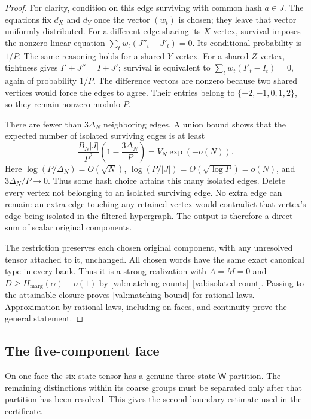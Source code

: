 \documentclass[11pt]{article}
\numberwithin{equation}{section}
\theoremstyle{definition}
\theoremstyle{remark}
\begin{document}
\begin{proof}
For clarity, condition on this edge surviving with common hash $a\in J$.
The equations fix $d_X$ and $d_Y$ once the vector $(w_t)$ is chosen; they
leave that vector uniformly distributed.  For a different edge sharing its
$X$ vertex, survival imposes the nonzero linear equation
$\sum_t w_t(J''_t-J'_t)=0$.  Its conditional probability is $1/P$.
The same reasoning holds for a shared $Y$ vertex.  For a shared $Z$ vertex,
tightness gives $I'+J''=I+J'$; survival is equivalent to
$\sum_t w_t(I'_t-I_t)=0$, again of probability $1/P$.
The difference vectors are nonzero because two shared vertices would force
the edges to agree.  Their entries belong to $\{-2,-1,0,1,2\}$, so they
remain nonzero modulo $P$.

There are fewer than $3\Delta_N$ neighboring edges.  A union bound shows
that the expected number of isolated surviving edges is at least
\begin{equation}
 \frac{B_N|J|}{P^2}
       \left(1-\frac{3\Delta_N}{P}\right)
       =V_N\exp(-o(N)).
\label{val:isolated-count}
\end{equation}
Here $\log(P/\Delta_N)=O(\sqrt N)$,
$\log(P/|J|)=O(\sqrt{\log P})=o(N)$, and
$3\Delta_N/P\to0$.  Thus some hash choice attains this many isolated edges.
Delete every vertex not belonging to an isolated surviving edge.  No extra
edge can remain: an extra edge touching any retained vertex would contradict
that vertex's edge being isolated in the filtered hypergraph.  The output
is therefore a direct sum of scalar original components.

The restriction preserves each chosen original component, with any
unresolved tensor attached to it, unchanged.  All chosen words have the
same exact canonical type in every bank.  Thus it is a strong realization
with $A=M=0$ and
$D\ge H_{\mathrm{marg}}(\alpha)-o(1)$ by
\eqref{val:matching-counts}--\eqref{val:isolated-count}.
Passing to the attainable closure proves \eqref{val:matching-bound} for
rational laws.  Approximation by rational laws, including on faces, and
continuity prove the general statement.
\end{proof}

\subsection{The five-component face}
\label{val:face-section}

On one face the six-state tensor has a genuine three-state $\mathsf W$ partition.
The remaining distinctions within its coarse groups must be separated only
after that partition has been resolved.  This gives the second boundary
estimate used in the certificate.
\end{document}
